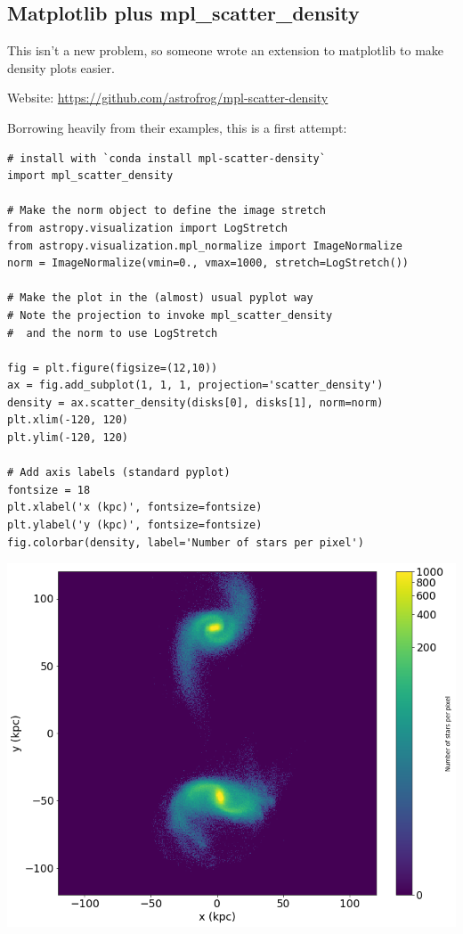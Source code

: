 \subsection{Matplotlib plus mpl\_scatter\_density}

This isn't a new problem, so someone wrote an extension to matplotlib to make density plots easier.

Website: \url{https://github.com/astrofrog/mpl-scatter-density}

Borrowing heavily from their examples, this is a first attempt:


\lstset{style=py} 
\begin{lstlisting}
# install with `conda install mpl-scatter-density`
import mpl_scatter_density

# Make the norm object to define the image stretch
from astropy.visualization import LogStretch
from astropy.visualization.mpl_normalize import ImageNormalize
norm = ImageNormalize(vmin=0., vmax=1000, stretch=LogStretch())

# Make the plot in the (almost) usual pyplot way
# Note the projection to invoke mpl_scatter_density
#  and the norm to use LogStretch

fig = plt.figure(figsize=(12,10))
ax = fig.add_subplot(1, 1, 1, projection='scatter_density')
density = ax.scatter_density(disks[0], disks[1], norm=norm)
plt.xlim(-120, 120)
plt.ylim(-120, 120)

# Add axis labels (standard pyplot)
fontsize = 18
plt.xlabel('x (kpc)', fontsize=fontsize)
plt.ylabel('y (kpc)', fontsize=fontsize)
fig.colorbar(density, label='Number of stars per pixel')
\end{lstlisting}

{\centering \includegraphics[scale=0.55]{msg} \par}


